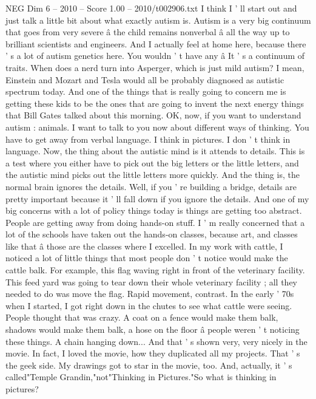 \begin{textsample}{NEG Dim 6 – 2010 – Score 1.00 – 2010/t002906.txt}  \label{ex:f6_neg_039}
I think I ' ll start out and just talk a little bit about what exactly autism is.
Autism is a very big continuum that goes from very severe â the child remains nonverbal â all the way up to brilliant scientists and engineers.
And I actually feel at home here, because there ' s a lot of autism genetics here.
You wouldn ' t have any â It ' s a continuum of traits.
When does a nerd turn into Asperger, which is just mild autism?
I mean, Einstein and Mozart and Tesla would all be probably diagnosed as autistic spectrum today.
And one of the things that is really going to concern me is getting these kids to be the ones that are going to invent the next energy things that Bill Gates talked about this morning.
OK, now, if you want to understand autism : animals.
I want to talk to you now about different ways of thinking.
You have to get away from verbal language.
I think in pictures.
I don ' t think in language.
Now, the thing about the autistic mind is it attends to details.
This is a test where you either have to pick out the big letters or the little letters, and the autistic mind picks out the little letters more quickly.
And the thing is, the normal brain ignores the details.
Well, if you ' re building a bridge, details are pretty important because it ' ll fall down if you ignore the details.
And one of my big concerns with a lot of policy things today is things are getting too abstract.
People are getting away from doing hands-on stuff.
I ' m really concerned that a lot of the schools have taken out the hands-on classes, because art, and classes like that â those are the classes where I excelled.
In my work with cattle, I noticed a lot of little things that most people don ' t notice would make the cattle balk.
For example, this flag waving right in front of the veterinary facility.
This feed yard was going to tear down their whole veterinary facility ; all they needed to do was move the flag.
Rapid movement, contrast.
In the early ' 70s when I started, I got right down in the chutes to see what cattle were seeing.
People thought that was crazy.
A coat on a fence would make them balk, shadows would make them balk, a hose on the floor â people weren ' t noticing these things.
A chain hanging down...
And that ' s shown very, very nicely in the movie.
In fact, I loved the movie, how they duplicated all my projects.
That ' s the geek side.
My drawings got to star in the movie, too.
And, actually, it ' s called"Temple Grandin,"not"Thinking in Pictures."So what is thinking in pictures?

\end{textsample}
